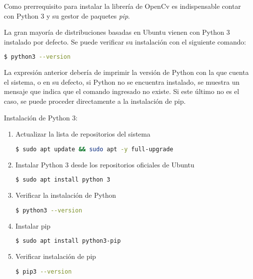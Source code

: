 Como prerrequisito para instalar la librería de OpenCv es indispensable contar con Python 3 y su gestor de paquetes \textit{pip}. 

La gran mayoría de distribuciones basadas en Ubuntu vienen con Python 3 instalado por defecto. Se puede verificar su instalación con el siguiente comando:

\begin{lstlisting}[language = bash]
    $ python3 --version 
\end{lstlisting}

La expresión anterior debería de imprimir la versión de Python con la que cuenta el sistema, o en su defecto, si Python no se encuentra instalado, se muestra un mensaje que indica que el comando ingresado no existe. Si este último no es el caso, se puede proceder directamente a la instalación de pip.

Instalación de Python 3:
\begin{enumerate}
    \item Actualizar la lista de repositorios del sistema

    \begin{lstlisting}[language = bash]
        $ sudo apt update && sudo apt -y full-upgrade
    \end{lstlisting}
    
    \item Instalar Python 3 desde los repositorios oficiales de Ubuntu

    \begin{lstlisting}[language = bash]
        $ sudo apt install python 3
    \end{lstlisting}

    \item Verificar la instalación de Python

    \begin{lstlisting}[language = bash]
        $ python3 --version 
    \end{lstlisting}

    \item Instalar pip 

    \begin{lstlisting}[language = bash]
        $ sudo apt install python3-pip
    \end{lstlisting}

    \item Verificar instalación de pip

    \begin{lstlisting}[language = bash]
        $ pip3 --version
    \end{lstlisting}
\end{enumerate}

